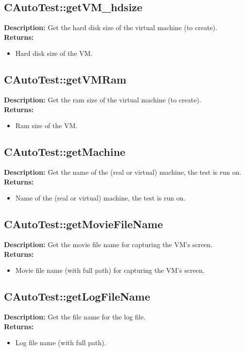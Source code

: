 \subsection{CAutoTest::getVM\_hdsize}
\textbf{Description:} Get the hard disk size of the virtual machine (to create).\\
\textbf{Returns:}
\begin{itemize}
\item Hard disk size of the VM.
\end{itemize}

\subsection{CAutoTest::getVMRam}
\textbf{Description:} Get the ram size of the virtual machine (to create).\\
\textbf{Returns:}
\begin{itemize}
\item Ram size of the VM.
\end{itemize}

\subsection{CAutoTest::getMachine}
\textbf{Description:} Get the name of the (real or virtual) machine, the test is run on.\\
\textbf{Returns:}
\begin{itemize}
\item Name of the (real or virtual) machine, the test is run on.
\end{itemize}

\subsection{CAutoTest::getMovieFileName}
\textbf{Description:} Get the movie file name for capturing the VM's screen.\\
\textbf{Returns:}
\begin{itemize}
\item Movie file name (with full path) for capturing the VM's screen.
\end{itemize}

\subsection{CAutoTest::getLogFileName}
\textbf{Description:} Get the file name for the log file.\\
\textbf{Returns:}
\begin{itemize}
\item Log file name (with full path).
\end{itemize}

